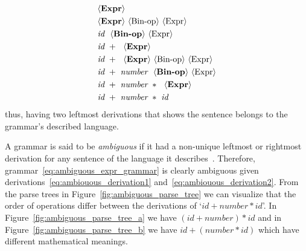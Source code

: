 \documentclass[
    oneside,
    english,
    coorientadorbanca,
    embeddedlogo,
    noabntexcite
]{ufsc-thesis-rn46-2019}
\newcommand{\bnfvar}[1]{\ \bnfvars{#1}}
\newcommand{\bnfvars}[1]{\langle\textrm{#1}\rangle}
\begin{document}
\begin{equation}\label{eq:ambiouous_derivation2}
    \begin{aligned}
         & \bnfvars{\textbf{Expr}}                                                  \\
         & \bnfvars{\textbf{Expr}}\bnfvar{Bin-op}\bnfvar{Expr}                      \\
         & \textit{id}\ \bnfvar{\textbf{Bin-op}}\bnfvar{Expr}                       \\
         & \textit{id}\ + \ \bnfvar{\textbf{Expr}}                                  \\
         & \textit{id}\ + \ \bnfvar{\textbf{Expr}}\bnfvar{Bin-op}\bnfvar{Expr}      \\
         & \textit{id}\ + \ \textit{number} \ \bnfvar{\textbf{Bin-op}}\bnfvar{Expr} \\
         & \textit{id}\ + \ \textit{number} \ * \ \bnfvar{\textbf{Expr}}            \\
         & \textit{id}\ + \ \textit{number} \ * \ \textit{id}
    \end{aligned}
\end{equation}
thus, having two leftmost derivations that shows the sentence belongs to the grammar's described language.

A grammar is said to be \textit{ambiguous} if it had a non-unique leftmost or rightmost derivation for any sentence of the language it describes~\cite{Aho:2006:CPT:1177220}.
Therefore, grammar~\eqref{eq:ambiguous_expr_grammar} is clearly ambiguous given derivations~\eqref{eq:ambiouous_derivation1} and~\eqref{eq:ambiouous_derivation2}.
From the parse trees in Figure~\ref{fig:ambiguous_parse_tree} we can visualize that the order of operations differ between the derivations of `$id + number * id$'.
In Figure~\ref{fig:ambiguous_parse_tree_a} we have $(id + number) * id$ and in Figure~\ref{fig:ambiguous_parse_tree_b} we have $id + (number * id)$ which have different mathematical meanings.
\end{document}
